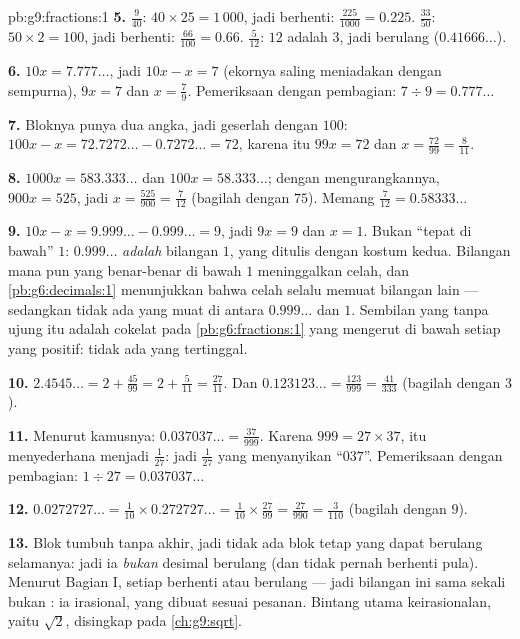 \begin{solution}{pb:g9:fractions:1}
\textbf{5.} $\frac{9}{40}$: $40 \times 25 = 1\,000$, jadi berhenti:
$\frac{225}{1000} = 0.225$. $\frac{33}{50}$:
$50 \times 2 = 100$, jadi berhenti: $\frac{66}{100} = 0.66$.
$\frac{5}{12}$: $12$ adalah  $3$, jadi berulang
($0.41666\ldots$).

\textbf{6.} $10x = 7.777\ldots$, jadi $10x - x = 7$ (ekornya
saling meniadakan dengan sempurna), $9x = 7$ dan $x = \frac79$.
Pemeriksaan dengan pembagian: $7 \div 9 = 0.777\ldots$

\textbf{7.} Bloknya punya dua angka, jadi geserlah dengan $100$:
$100x - x = 72.7272\ldots - 0.7272\ldots = 72$, karena itu
$99x = 72$ dan $x = \frac{72}{99} = \frac{8}{11}$.

\textbf{8.} $1000x = 583.333\ldots$ dan $100x = 58.333\ldots$;
dengan mengurangkannya, $900x = 525$, jadi
$x = \frac{525}{900} = \frac{7}{12}$ (bagilah dengan $75$). Memang
$\frac{7}{12} = 0.58333\ldots$

\textbf{9.} $10x - x = 9.999\ldots - 0.999\ldots = 9$, jadi
$9x = 9$ dan $x = 1$. Bukan ``tepat di bawah'' $1$:
$0.999\ldots$ \emph{adalah} bilangan $1$, yang ditulis dengan kostum
kedua. Bilangan mana pun yang benar-benar di bawah $1$ meninggalkan
celah, dan \cref{pb:g6:decimals:1} menunjukkan bahwa celah selalu
memuat bilangan lain --- sedangkan tidak ada yang muat di antara
$0.999\ldots$ dan $1$. Sembilan yang tanpa ujung itu adalah 
cokelat pada \cref{pb:g6:fractions:1} yang mengerut di bawah setiap
 yang positif: tidak ada yang tertinggal.

\textbf{10.} $2.4545\ldots = 2 + \frac{45}{99} = 2 +
\frac{5}{11} = \frac{27}{11}$. Dan
$0.123123\ldots = \frac{123}{999} = \frac{41}{333}$ (bagilah dengan
$3$).

\textbf{11.} Menurut kamusnya: $0.037037\ldots = \frac{37}{999}$.
Karena $999 = 27 \times 37$,  itu menyederhana menjadi
$\frac{1}{27}$: jadi  $\frac{1}{27}$ yang menyanyikan
``$037$''. Pemeriksaan dengan pembagian:
$1 \div 27 = 0.037037\ldots$

\textbf{12.} $0.0272727\ldots = \frac{1}{10} \times
0.272727\ldots = \frac{1}{10} \times \frac{27}{99}
= \frac{27}{990} = \frac{3}{110}$ (bagilah dengan $9$).

\textbf{13.} Blok  tumbuh tanpa akhir, jadi tidak ada blok
tetap yang dapat berulang selamanya: jadi ia \emph{bukan} desimal
berulang (dan tidak pernah berhenti pula). Menurut Bagian I, setiap
 berhenti atau berulang --- jadi bilangan ini sama sekali bukan
: ia irasional, yang dibuat sesuai pesanan. Bintang utama
keirasionalan, yaitu $\sqrt2$, disingkap pada \cref{ch:g9:sqrt}.


\end{solution}
